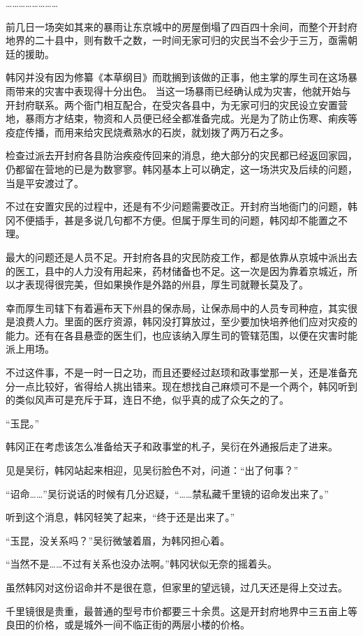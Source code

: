 ……………………

前几日一场突如其来的暴雨让东京城中的房屋倒塌了四百四十余间，而整个开封府地界的二十县中，则有数千之数，一时间无家可归的灾民当不会少于三万，亟需朝廷的援助。

韩冈并没有因为修纂《本草纲目》而耽搁到该做的正事，他主掌的厚生司在这场暴雨带来的灾害中表现得十分出色。
当这一场暴雨已经确认成为灾害，他就开始与开封府联系。两个衙门相互配合，在受灾各县中，为无家可归的灾民设立安置营地，暴雨方才结束，物资和人员便已经全都准备完成。光是为了防止伤寒、痢疾等疫症传播，而用来给灾民烧煮熟水的石炭，就划拨了两万石之多。

检查过派去开封府各县防治疾疫传回来的消息，绝大部分的灾民都已经返回家园，仍都留在营地的已是为数寥寥。韩冈基本上可以确定，这一场洪灾及后续的问题，当是平安渡过了。

不过在安置灾民的过程中，还是有不少问题需要改正。开封府当地衙门的问题，韩冈不便插手，甚是多说几句都不方便。但属于厚生司的问题，韩冈却不能置之不理。

最大的问题还是人员不足。开封府各县的灾民防疫工作，都是依靠从京城中派出去的医工，县中的人力没有用起来，药材储备也不足。这一次是因为靠着京城近，所以才表现得很完美，但如果换作是外路的州县，厚生司就鞭长莫及了。

幸而厚生司辖下有着遍布天下州县的保赤局，让保赤局中的人员专司种痘，其实很是浪费人力。里面的医疗资源，韩冈没打算放过，至少要加快培养他们应对灾疫的能力。还有在各县悬壶的医生们，也应该纳入厚生司的管辖范围，以便在灾害时能派上用场。

不过这件事，不是一时一日之功，而且还要经过赵顼和政事堂那一关，还是准备充分一点比较好，省得给人挑出错来。现在想找自己麻烦可不是一个两个，韩冈听到的类似风声可是充斥于耳，连日不绝，似乎真的成了众矢之的了。

“玉昆。”

韩冈正在考虑该怎么准备给天子和政事堂的札子，吴衍在外通报后走了进来。

见是吴衍，韩冈站起来相迎，见吴衍脸色不对，问道：“出了何事？”

“诏命……”吴衍说话的时候有几分迟疑，“……禁私藏千里镜的诏命发出来了。”

听到这个消息，韩冈轻笑了起来，“终于还是出来了。”

“玉昆，没关系吗？”吴衍微皱着眉，为韩冈担心着。

“当然不是……不过有关系也没办法啊。”韩冈状似无奈的摇着头。

虽然韩冈对这份诏命并不是很在意，但家里的望远镜，过几天还是得上交过去。

千里镜很是贵重，最普通的型号市价都要三十余贯。这是开封府地界中三五亩上等良田的价格，或是城外一间不临正街的两层小楼的价格。

